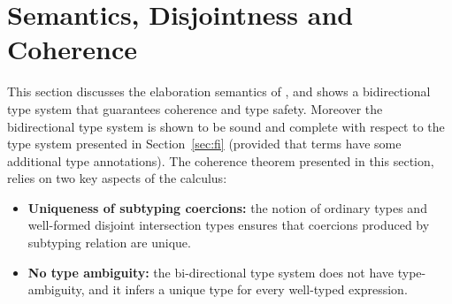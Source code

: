 \section{Semantics, Disjointness and Coherence}
\label{sec:disjoint}
This section discusses the elaboration semantics of \name, and shows a
bidirectional type system that guarantees coherence and type
safety. Moreover the bidirectional type system is shown to be sound
and complete with respect to the type system presented in
Section~\ref{sec:fi} (provided that terms have some additional type
annotations). 
The coherence theorem presented in this section, relies on two key
aspects of the calculus:

\begin{itemize}

\item {\bf Uniqueness of subtyping coercions:} the notion of ordinary
  types and well-formed disjoint intersection types ensures that
  coercions produced by subtyping relation are unique.

\item {\bf No type ambiguity:} the bi-directional type system does not
  have type-ambiguity, and it infers a
  unique type for every well-typed expression. 


\end{itemize}

%
%
%


